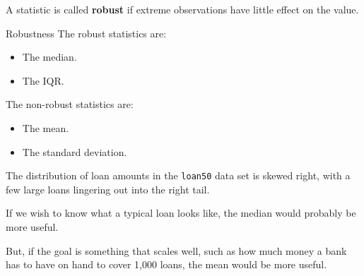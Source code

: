 \documentclass{beamer}
\begin{document}
\begin{frame}
\begin{definition}
A statistic is called \textbf{robust} if extreme observations have little effect on the value.
\end{definition}\pause

\begin{block}{Robustness}
The robust statistics are:
\begin{itemize}
\item The median.
\item The IQR.\@
\end{itemize}\pause

The non-robust statistics are:
\begin{itemize}
\item The mean.
\item The standard deviation.
\end{itemize}
\end{block}
\end{frame}

\begin{frame}
\begin{example}
The distribution of loan amounts in the \texttt{loan50} data set is skewed right, with a few large loans lingering out into the right tail.
\begin{center}
\end{center}
\pause
{}\pause

\vspace{1.5mm}
If we wish to know what a typical loan looks like, the median would probably be more useful. \pause

\vspace{1.5mm}
But, if the goal is something that scales well, such as how much money a bank has to have on hand to cover 1,000 loans, the mean would be more useful.
\end{example}
\end{frame}
\end{document}
